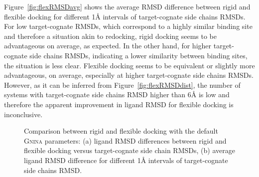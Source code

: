 \documentclass[linenumbers,doublespacing]{bmcart}
\begin{document}
Figure~\ref{fig:flexRMSDavg} shows the average RMSD difference between rigid and flexible docking for different 1{\AA} intervals of target-cognate side chains RMSDs. For low target-cognate RMSDs, which correspond to a highly similar binding site and therefore a situation akin to redocking, rigid docking seems to be advantageous on average, as expected. In the other hand, for higher target-cognate side chains RMSDs, indicating a lower similarity between binding sites, the situation is less clear. Flexible docking seems to be equivalent or slightly more advantageous, on average, especially at higher target-cognate side chains RMSDs. However, as it can be inferred from Figure~\ref{fig:flexRMSDdist}, the number of systems with target-cognate side chains RMSD higher than 6{\AA} is low and therefore the apparent improvement in ligand RMSD for flexible docking is inconclusive.

\begin{figure}[tb]  
	\caption{Comparison between rigid and flexible docking with the default \textsc{Gnina} parameters: (a) ligand RMSD differences between rigid and flexible docking versus target-cognate side chain RMSDs, (b) average ligand RMSD difference for different 1{\AA} intervals of target-cognate side chains RMSD.}
	\label{fig:flexCD}
\end{figure}
\end{document}
